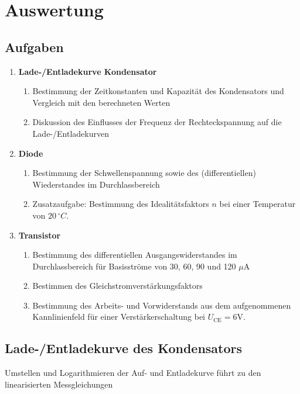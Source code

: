 \section{Auswertung}

\subsection{Aufgaben}
\begin{enumerate}
  \item \textbf{Lade-/Entladekurve Kondensator}
    \begin{enumerate}
      \item  Bestimmung der Zeitkonstanten und Kapazität des Kondensators und
        Vergleich mit den berechneten Werten
      \item Diskussion des Einflusses der Frequenz der Rechteckspannung auf die
        Lade-/Entladekurven
    \end{enumerate}
  \item \textbf{Diode}
    \begin{enumerate}
      \item Bestimmung der Schwellenspannung sowie des (differentiellen)
        Wiederstandes im Durchlassbereich
      \item Zusatzaufgabe: Bestimmung des Idealitätsfaktors $n$ bei einer
        Temperatur von $20\,^\circ C$.
    \end{enumerate}
  \item \textbf{Transistor}
    \begin{enumerate}
      \item Bestimmung des differentiellen Ausgangswiderstandes im
        Durchlassbereich für Basisströme von 30, 60, 90 und 120 $\mu$A
      \item Bestimmen des Gleichstromverstärkungsfaktors
      \item Bestimmung des Arbeits- und Vorwiderstands aus dem aufgenommenen
        Kannlinienfeld für einer Verstärkerschaltung bei $U_\text{CE} = 6
        \text{V}$.
    \end{enumerate}
\end{enumerate}

\subsection{Lade-/Entladekurve des Kondensators}

Umstellen und Logarithmieren der Auf- und Entladekurve führt zu den
linearisierten Messgleichungen

